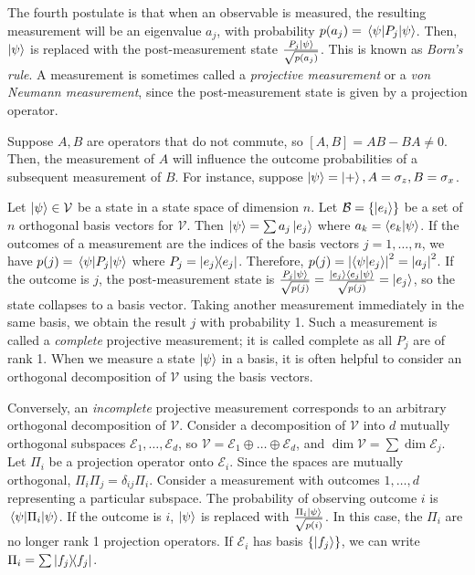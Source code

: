 The fourth postulate is that when an observable is measured, the resulting measurement will be an eigenvalue \( a_j \), with probability \( p(a_j) = \ev{P_j}{\psi} \).
Then, \( \ket{\psi} \) is replaced with the post-measurement state \( \frac{P_j \ket{\psi}}{\sqrt{p(a_j)}} \).
This is known as \emph{Born's rule}.
A measurement is sometimes called a \emph{projective measurement} or a \emph{von Neumann measurement}, since the post-measurement state is given by a projection operator.

Suppose \( A, B \) are operators that do not commute, so \( [A,B] = AB - BA \neq 0 \).
Then, the measurement of \( A \) will influence the outcome probabilities of a subsequent measurement of \( B \).
For instance, suppose \( \ket{\psi} = \ket{+}, A = \sigma_z, B = \sigma_x \).

Let \( \ket{\psi} \in \mathcal V \) be a state in a state space of dimension \( n \).
Let \( \mathcal B = \qty{\ket{e_i}} \) be a set of \( n \) orthogonal basis vectors for \( \mathcal V \).
Then \( \ket{\psi} = \sum a_j \ket{e_j} \) where \( a_k = \ip{e_k}{\psi} \).
If the outcomes of a measurement are the indices of the basis vectors \( j = 1, \dots, n \), we have \( p(j) = \ev{P_j}{\psi} \) where \( P_j = \op{e_j}{e_j} \).
Therefore, \( p(j) = \abs{\ip{\psi}{e_j}}^2 = \abs{a_j}^2 \).
If the outcome is \( j \), the post-measurement state is \( \frac{P_j \ket{\psi}}{\sqrt{p(j)}} = \frac{\ket{e_j} \ip{e_j}{\psi}}{\sqrt{p(j)}} = \ket{e_j} \), so the state collapses to a basis vector.
Taking another measurement immediately in the same basis, we obtain the result \( j \) with probability 1.
Such a measurement is called a \emph{complete} projective measurement; it is called complete as all \( P_j \) are of rank 1.
When we measure a state \( \ket{\psi} \) in a basis, it is often helpful to consider an orthogonal decomposition of \( \mathcal V \) using the basis vectors.

Conversely, an \emph{incomplete} projective measurement corresponds to an arbitrary orthogonal decomposition of \( \mathcal V \).
Consider a decomposition of \( \mathcal V \) into \( d \) mutually orthogonal subspaces \( \mathcal E_1, \dots, \mathcal E_d \), so \( \mathcal V = \mathcal E_1 \oplus \dots \oplus \mathcal E_d \), and \( \dim \mathcal V = \sum \dim \mathcal E_j \).
Let \( \Pi_i \) be a projection operator onto \( \mathcal E_i \).
Since the spaces are mutually orthogonal, \( \Pi_i \Pi_j = \delta_{ij} \Pi_i \).
Consider a measurement with outcomes \( 1, \dots, d \) representing a particular subspace.
The probability of observing outcome \( i \) is \( \ev{\Pi_i}{\psi} \).
If the outcome is \( i \), \( \ket{\psi} \) is replaced with \( \frac{\Pi_i \ket{\psi}}{\sqrt{p(i)}} \).
In this case, the \( \Pi_i \) are no longer rank 1 projection operators.
If \( \mathcal E_i \) has basis \( \qty{\ket{f_j}} \), we can write \( \Pi_i = \sum \op{f_j}{f_j} \).

